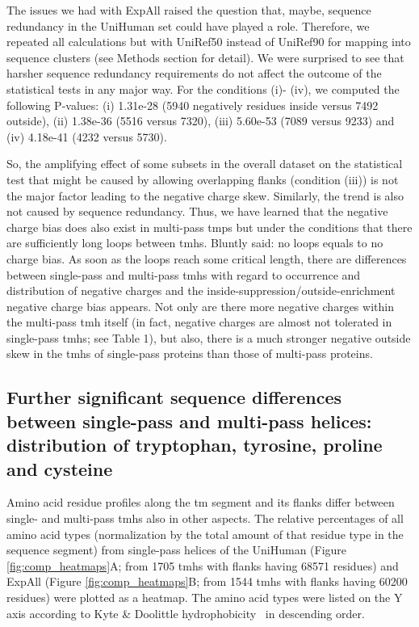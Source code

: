 The issues we had with ExpAll raised the question that, maybe, sequence redundancy in the UniHuman set could have played a role. Therefore, we repeated all calculations but with UniRef50 instead of UniRef90 for mapping into sequence clusters (see Methods section for detail). We were surprised to see that harsher sequence redundancy requirements do not affect the outcome of the statistical tests in any major way. For the conditions (i)- (iv), we computed the following P-values: (i) 1.31e-28 (5940 negatively residues inside versus 7492 outside), (ii) 1.38e-36 (5516 versus 7320), (iii) 5.60e-53 (7089 versus 9233) and (iv) 4.18e-41 (4232 versus 5730).

So, the amplifying effect of some subsets in the overall dataset on the statistical test that might be caused by allowing overlapping flanks (condition (iii)) is not the major factor leading to the negative charge skew. Similarly, the trend is also not caused by sequence redundancy. Thus, we have learned that the negative charge bias does also exist in multi-pass \gls{tmp}s but under the conditions that there are sufficiently long loops between \gls{tmh}s. Bluntly said: no loops equals to no charge bias. As soon as the loops reach some critical length, there are differences between single-pass and multi-pass \gls{tmh}s with regard to occurrence and distribution of negative charges and the inside-suppression/outside-enrichment negative charge bias appears. Not only are there more negative charges within the multi-pass \gls{tmh} itself (in fact, negative charges are almost not tolerated in single-pass \gls{tmh}s; see Table 1), but also, there is a much stronger negative outside skew in the \gls{tmh}s of single-pass proteins than those of multi-pass proteins.

\subsection{Further significant sequence differences between single-pass and multi-pass helices: distribution of tryptophan, tyrosine, proline and cysteine}

Amino acid residue profiles along the \gls{tm} segment and its flanks differ between single- and multi-pass \gls{tmh}s also in other aspects. The relative percentages of all amino acid types (normalization by the total amount of that residue type in the sequence segment) from single-pass helices of the UniHuman (Figure \ref{fig:comp_heatmaps}A; from 1705 \gls{tmh}s with flanks having 68571 residues) and ExpAll (Figure \ref{fig:comp_heatmaps}B; from 1544 \gls{tmh}s with flanks having 60200 residues) were plotted as a heatmap. The amino acid types were listed on the Y axis according to Kyte \& Doolittle hydrophobicity~\cite{Kyte1982} in descending order.

